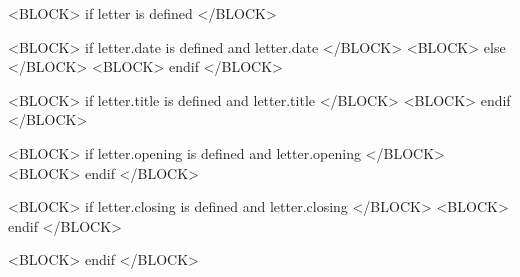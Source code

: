 
<BLOCK> if letter is defined </BLOCK>

<BLOCK> if letter.date is defined and letter.date </BLOCK>
<BLOCK> else </BLOCK>
<BLOCK> endif </BLOCK>

<BLOCK> if letter.title is defined and letter.title </BLOCK>
<BLOCK> endif </BLOCK>

<BLOCK> if letter.opening is defined and letter.opening </BLOCK>
<BLOCK> endif </BLOCK>

<BLOCK> if letter.closing is defined and letter.closing </BLOCK>
<BLOCK> endif </BLOCK>

<BLOCK> endif </BLOCK>
